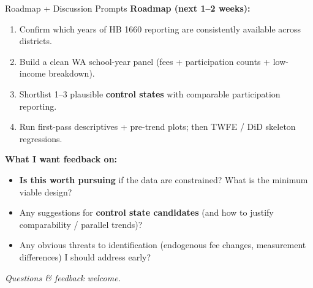 \documentclass[11pt]{beamer}
\begin{document}
\begin{frame}{Roadmap + Discussion Prompts}
\textbf{Roadmap (next 1--2 weeks):}
\begin{enumerate}
  \item Confirm which years of HB 1660 reporting are consistently available across districts.
  \item Build a clean WA school-year panel (fees + participation counts + low-income breakdown).
  \item Shortlist 1--3 plausible \textbf{control states} with comparable participation reporting.
  \item Run first-pass descriptives + pre-trend plots; then TWFE / DiD skeleton regressions.
\end{enumerate}

\vspace{0.75em}
\textbf{What I want feedback on:}
\begin{itemize}
  \item \textbf{Is this worth pursuing} if the data are constrained? What is the minimum viable design?
  \item Any suggestions for \textbf{control state candidates} (and how to justify comparability / parallel trends)?
  \item Any obvious threats to identification (endogenous fee changes, measurement differences) I should address early?
\end{itemize}

\vspace{0.5em}
\textit{Questions \& feedback welcome.}
\end{frame}
\end{document}
